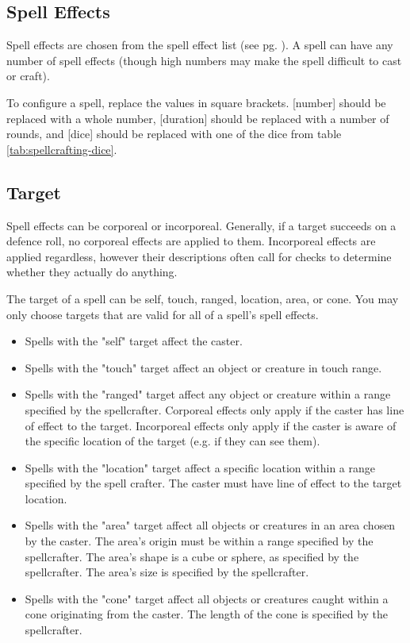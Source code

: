 \begin{multicols*}{2}
    \subsection{Spell Effects}
    Spell effects are chosen from the spell effect list (see pg.
    \pageref{spell-effect-list}). A spell can have any number of spell effects
    (though high numbers may make the spell difficult to cast or craft).

    To configure a spell, replace the values in square brackets. [number] should
    be replaced with a whole number, [duration] should be replaced with a number
    of rounds, and [dice] should be replaced with one of the dice from table
    \ref{tab:spellcrafting-dice}.


    \subsection{Target}
    Spell effects can be corporeal or incorporeal. Generally, if a target succeeds on a
    defence roll, no corporeal effects are applied to them. Incorporeal effects
    are applied regardless, however their descriptions often call for checks
    to determine whether they actually do anything.

    The target of a spell can be self, touch, ranged, location, area, or cone.
    You may only choose targets that are valid for all of a spell's spell
    effects.
    \begin{itemize}
        \item Spells with the "self" target affect the caster.
        \item Spells with the "touch" target affect an object or creature in
            touch range.
        \item Spells with the "ranged" target affect any object or creature
            within a range specified by the spellcrafter.
            Corporeal effects only apply if the caster has line of effect
            to the target. Incorporeal effects only apply if the caster is
            aware of the specific location of the target (e.g. if they can see
            them).
        \item Spells with the "location" target affect a specific location
            within a range specified by the spell crafter. The caster must have
            line of effect to the target location.
        \item Spells with the "area" target affect all objects or creatures
            in an area chosen by the caster. The area's origin must be within
            a range specified by the spellcrafter. The area's shape is a cube
            or sphere, as specified by the spellcrafter. The area's size is
            specified by the spellcrafter.
        \item Spells with the "cone" target affect all objects or creatures
            caught within a cone originating from the caster. The length of
            the cone is specified by the spellcrafter.
    \end{itemize}


\end{multicols*}
